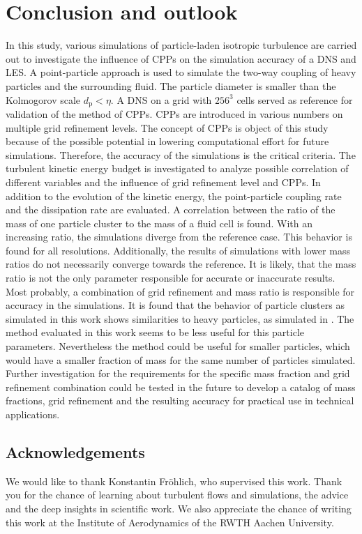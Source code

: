 \documentclass[11pt,a4paper,openany,oneside,parskip=half*]{article}
\begin{document}
\section{Conclusion and outlook}
In this study, various simulations of particle-laden isotropic turbulence are carried out to investigate the influence of CPPs on the simulation accuracy of a DNS and LES. A point-particle approach is used to simulate the two-way coupling of heavy particles and the surrounding fluid. The particle diameter is smaller than the Kolmogorov scale $d_\mathrm{p} < \eta$. A DNS on a grid with $256^3$ cells served as reference for validation of the method of CPPs. CPPs are introduced in various numbers on multiple grid refinement levels. The concept of CPPs is object of this study because of the possible potential in lowering computational effort for future simulations. Therefore, the accuracy of the simulations is the critical criteria. The turbulent kinetic energy budget is investigated to analyze possible correlation of different variables and the influence of grid refinement level and CPPs. In addition to the evolution of the kinetic energy, the point-particle coupling rate and the dissipation rate are evaluated.
\newline
A correlation between the ratio of the mass of one particle cluster to the mass of a fluid cell is found. With an increasing ratio, the simulations diverge from the reference case. This behavior is found for all resolutions. Additionally, the results of simulations with lower mass ratios do not necessarily converge towards the reference. It is likely, that the mass ratio is not the only parameter responsible for accurate or inaccurate results. Most probably, a combination of grid refinement and mass ratio is responsible for accuracy in the simulations.
It is found that the behavior of particle clusters as simulated in this work shows similarities to heavy particles, as simulated in \cite{Schneiders2017}.
\newline
The method evaluated in this work seems to be less useful for this particle parameters. Nevertheless the method could be useful for smaller particles, which would have a smaller fraction of mass for the same number of particles simulated. Further investigation for the requirements for the specific mass fraction and grid refinement combination could be tested in the future to develop a catalog of mass fractions, grid refinement and the resulting accuracy for practical use in technical applications. 
\subsection*{Acknowledgements}
We would like to thank Konstantin Fr\"ohlich, who supervised this work. Thank you for the chance of learning about turbulent flows and simulations, the advice and the deep insights in scientific work. We also appreciate the chance of writing this work at the Institute of Aerodynamics of the RWTH Aachen University.
\pagebreak
\end{document}
